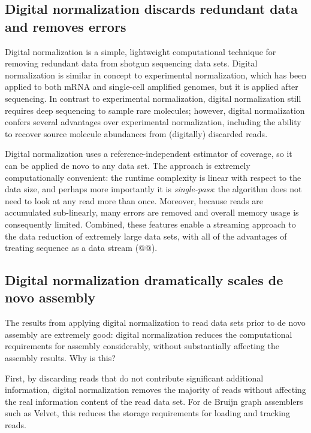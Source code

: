 \documentclass[10pt]{article}
\begin{document}

\subsection*{Digital normalization discards redundant data and removes errors}

Digital normalization is a simple, lightweight computational technique
for removing redundant data from shotgun sequencing data sets.
Digital normalization is similar in concept to experimental
normalization, which has been applied to both mRNA and single-cell
amplified genomes, but it is applied after sequencing.  In contrast to
experimental normalization, digital normalization still requires deep
sequencing to sample rare molecules; however, digital normalization
confers several advantages over experimental normalization, including
the ability to recover source molecule abundances from
(digitally) discarded reads.

Digital normalization uses a reference-independent estimator of
coverage, so it can be applied de novo to any data set.  The approach
is extremely computationally convenient: the runtime complexity is
linear with respect to the data size, and perhaps more importantly it
is {\em single-pass}: the algorithm does not need to look
at any read more than once.  Moreover, because reads are accumulated
sub-linearly, many errors are removed and overall memory usage is
consequently limited.  Combined, these features enable a streaming
approach to the data reduction of extremely large data sets, with all
of the advantages of treating sequence as a data stream (@@).

\subsection*{Digital normalization dramatically scales de novo assembly}

The results from applying digital normalization to read data sets
prior to de novo assembly are extremely good: digital normalization
reduces the computational requirements for assembly considerably,
without substantially affecting the assembly results.  Why is this?

First, by discarding reads that do not contribute significant
additional information, digital normalization removes the majority of
reads without affecting the real information content of the read data
set.  For de Bruijn graph assemblers such as Velvet, this reduces the
storage requirements for loading and tracking reads.
\end{document}
